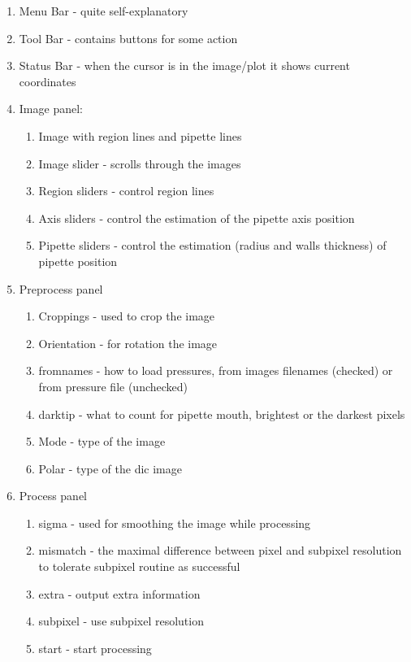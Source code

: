\documentclass[a4paper,12pt]{article}
\begin{document}
\begin{enumerate}
	\item Menu Bar - quite self-explanatory
	\item Tool Bar - contains buttons for some action
	\item Status Bar - when the cursor is in the image/plot it shows current coordinates 
	\item Image panel:
	\begin{enumerate}
		\item Image with region lines and pipette lines
		\item Image slider - scrolls through the images
		\item Region sliders - control region lines
		\item Axis sliders - control the estimation of the pipette axis position
		\item Pipette sliders - control the estimation (radius and walls thickness) of pipette position
	\end{enumerate}
	\item Preprocess panel
	\begin{enumerate}
		\item Croppings - used to crop the image
		\item Orientation - for rotation the image
		\item fromnames - how to load pressures, from images filenames (checked) or from pressure file (unchecked)
		\item darktip - what to count for pipette mouth, brightest or the darkest pixels
		\item Mode - type of the image
		\item Polar - type of the dic image
	\end{enumerate}
	\item Process panel
	\begin{enumerate}
		\item sigma - used for smoothing the image while processing
		\item mismatch - the maximal difference between pixel and subpixel resolution to tolerate subpixel routine as successful
		\item extra - output extra information
		\item subpixel - use subpixel resolution
		\item start - start processing 
	\end{enumerate}
\end{enumerate}
\end{document}
